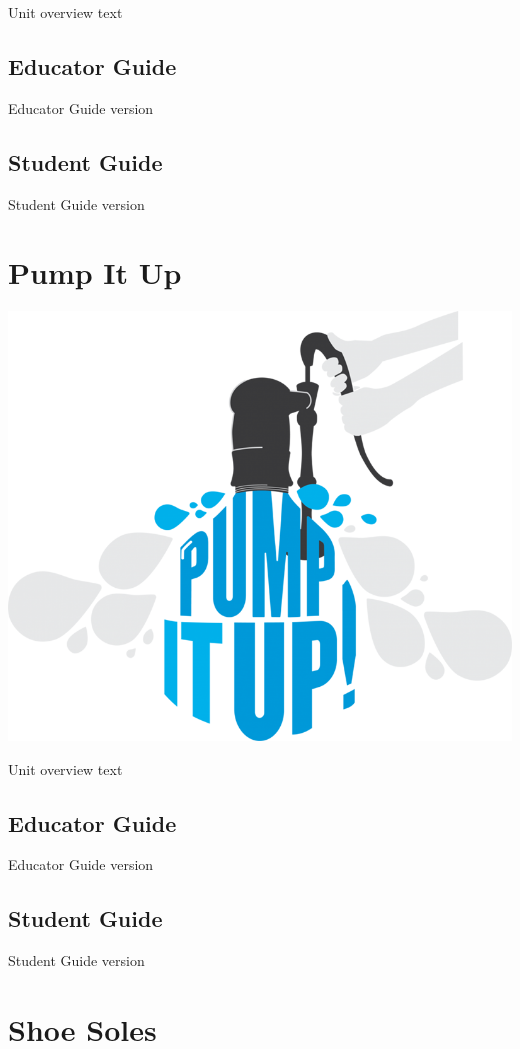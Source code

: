 \documentclass[]{book}
\begin{document}
Unit overview text

\section{Educator Guide}\label{educator-guide-3}

Educator Guide version

\section{Student Guide}\label{student-guide-3}

Student Guide version

\chapter{Pump It Up}\label{pump-it-up}

\begin{center}\includegraphics[width=0.5\linewidth]{img/pumpItUp} \end{center}

Unit overview text

\section{Educator Guide}\label{educator-guide-4}

Educator Guide version

\section{Student Guide}\label{student-guide-4}

Student Guide version

\chapter{Shoe Soles}\label{shoe-soles}
\end{document}
